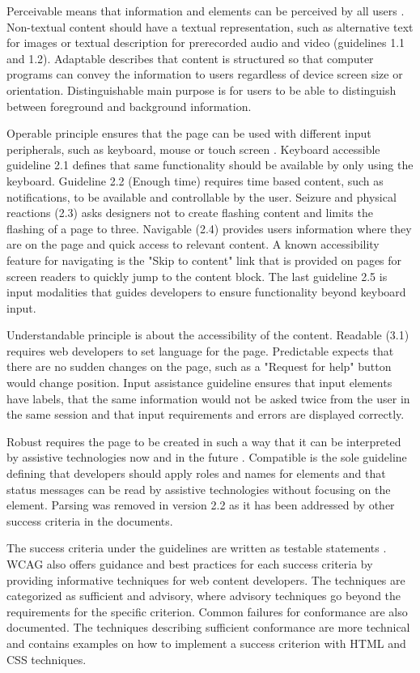 Perceivable means that information and elements can be perceived by all users \citep{wcag22}. Non-textual content should have a textual representation, such as alternative text for images or textual description for prerecorded audio and video (guidelines 1.1 and 1.2). Adaptable describes that content is structured so that computer programs can convey the information to users regardless of device screen size or orientation. Distinguishable main purpose is for users to be able to distinguish between foreground and background information.

Operable principle ensures that the page can be used with different input peripherals, such as keyboard, mouse or touch screen \citep{wcag22}. Keyboard accessible guideline 2.1 defines that same functionality should be available by only using the keyboard. Guideline 2.2 (Enough time) requires time based content, such as notifications, to be available and controllable by the user. Seizure and physical reactions (2.3) asks designers not to create flashing content and limits the flashing of a page to three. Navigable (2.4) provides users information where they are on the page and quick access to relevant content. A known accessibility feature for navigating is the "Skip to content" link that is provided on pages for screen readers to quickly jump to the content block. The last guideline 2.5 is input modalities that guides developers to ensure functionality beyond keyboard input.

Understandable principle is about the accessibility of the content. Readable (3.1) requires web developers to set language for the page. Predictable expects that there are no sudden changes on the page, such as a "Request for help" button would change position. Input assistance guideline ensures that input elements have labels, that the same information would not be asked twice from the user in the same session and that input requirements and errors are displayed correctly. 

Robust requires the page to be created in such a way that it can be interpreted by assistive technologies now and in the future \citep{wcag22}. Compatible is the sole guideline defining that developers should apply roles and names for elements and that status messages can be read by assistive technologies without focusing on the element. Parsing was removed in version 2.2 as it has been addressed by other success criteria in the documents.

The success criteria under the guidelines are written as testable statements \citep{wcag22}. WCAG also offers guidance and best practices for each success criteria by providing informative techniques for web content developers. The techniques are categorized as sufficient and advisory, where advisory techniques go beyond the requirements for the specific criterion. Common failures for conformance are also documented. The techniques describing sufficient conformance are more technical and contains examples on how to implement a success criterion with HTML and CSS techniques. 

